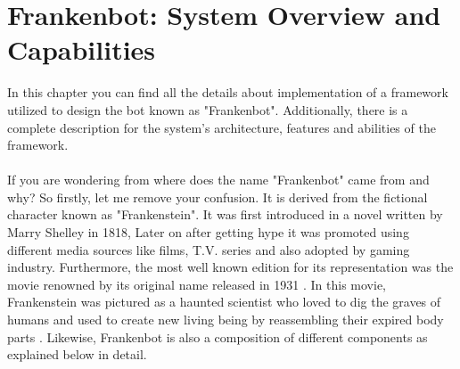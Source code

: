 \chapter{Frankenbot: System Overview and Capabilities \label{cha:chapter3}}
In this chapter you can find all the details about implementation of a framework utilized to design the bot known as "Frankenbot". Additionally, there is a complete description for the system's architecture, features and abilities of the framework. 
\\~\\
If you are wondering from where does the name "Frankenbot" came from and why? So firstly, let me remove your confusion. It is derived from the fictional character known as "Frankenstein". It was first introduced in a novel written by Marry Shelley in 1818, Later on after getting hype it was promoted using different media sources like films, T.V. series and also adopted by gaming industry. Furthermore, the most well known edition for its representation was the movie renowned by its original name released in 1931 \cite{frankenstein}. In this movie, Frankenstein was pictured as a haunted scientist who loved to dig the graves of humans and used to create new living being by reassembling their expired body parts \cite{frankensteinmovie}. Likewise, Frankenbot is also a composition of different components as explained below in detail.

